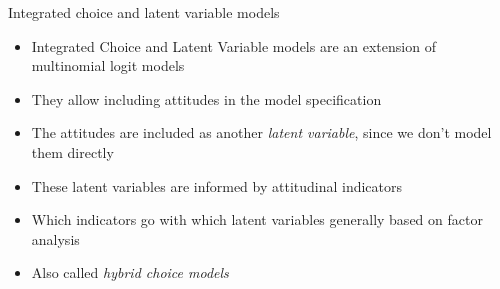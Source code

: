 \begin{frame}{Integrated choice and latent variable models}
  \begin{itemize}
    \item Integrated Choice and Latent Variable models are an extension of multinomial logit models
    \item They allow including attitudes in the model specification
    \item The attitudes are included as another \emph{latent variable}, since we don't model them directly
    \item These latent variables are informed by attitudinal indicators
    \item Which indicators go with which latent variables generally based on factor analysis
    \item Also called \emph{hybrid choice models}
  \end{itemize}
\end{frame}

